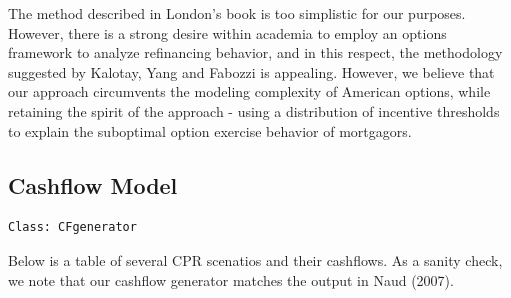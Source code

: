 \documentclass[10pt,letterpaper]{article}
\begin{document}
The method described in London's book is too simplistic for our purposes. However, there is a strong desire within academia to employ an options framework to analyze refinancing behavior, and in this respect, the methodology suggested by Kalotay, Yang and Fabozzi is appealing. However, we believe that our approach circumvents the modeling complexity of American options, while retaining the spirit of the approach - using a distribution of incentive thresholds to explain the suboptimal option exercise behavior of mortgagors. 
\subsection{Cashflow Model}
\begin{verbatim}
Class: CFgenerator
\end{verbatim}
Below is a table of several CPR scenatios and their cashflows. As a sanity check, we note that our cashflow generator matches the output in Naud (2007).\\
\end{document}
